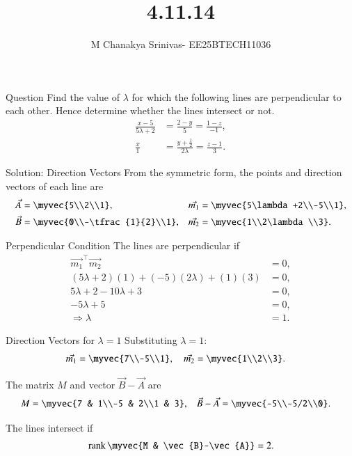 \documentclass{beamer}
\title %
{4.11.14}
\date{}
\author %
{M Chanakya Srinivas- EE25BTECH11036}
\begin{document}
\frame{\titlepage}



\begin{frame}{Question}
Find the value of $\lambda$ for which the following lines are perpendicular to each other. Hence determine whether the lines intersect or not.
\begin{align}
\frac{x-5}{5\lambda+2} &= \frac{2-y}{5} = \frac{1-z}{-1}, \\
\frac{x}{1} &= \frac{y+\tfrac{1}{2}}{2\lambda} = \frac{z-1}{3}.
\end{align}
\end{frame}

\begin{frame}{Solution: Direction Vectors}
From the symmetric form, the points and direction vectors of each line are
\begin{align}
\vec{A} &= \myvec{5\\2\\1}, &
\vec{m_1} &= \myvec{5\lambda+2\\-5\\1}, \\
\vec{B} &= \myvec{0\\-\tfrac{1}{2}\\1}, &
\vec{m_2} &= \myvec{1\\2\lambda\\3}.
\end{align}
\end{frame}

\begin{frame}{Perpendicular Condition}
The lines are perpendicular if
\begin{align}
\vec{m_1}^\top \vec{m_2} &= 0, \\
(5\lambda+2)(1) + (-5)(2\lambda) + (1)(3) &= 0, \\
5\lambda + 2 - 10\lambda + 3 &= 0, \\
-5\lambda + 5 &= 0, \\
\Rightarrow \lambda &= 1.
\end{align}
\end{frame}

\begin{frame}{Direction Vectors for $\lambda=1$}
Substituting $\lambda=1$:
\begin{align}
\vec{m_1} &= \myvec{7\\-5\\1}, \quad 
\vec{m_2} = \myvec{1\\2\\3}.
\end{align}

The matrix $M$ and vector $\vec{B}-\vec{A}$ are
\begin{align}
M &= \myvec{7 & 1\\-5 & 2\\1 & 3}, &
\vec{B}-\vec{A} &= \myvec{-5\\-5/2\\0}.
\end{align}

The lines intersect if
\begin{align}
\operatorname{rank}\myvec{M & \vec{B}-\vec{A}} = 2.
\end{align}
\end{frame}
\end{document}
